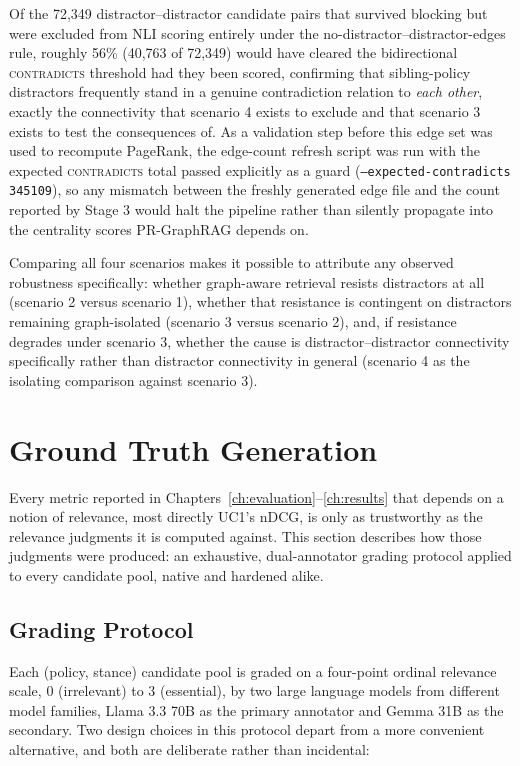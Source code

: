 Of the 72,349 distractor--distractor candidate pairs that survived blocking but were excluded from
NLI scoring entirely under the no-distractor--distractor-edges rule, roughly 56\% (40,763 of
72,349) would have cleared the bidirectional \textsc{contradicts} threshold had they been scored,
confirming that sibling-policy distractors frequently stand in a genuine contradiction relation to
\emph{each other}, exactly the connectivity that scenario 4 exists to exclude and that scenario 3
exists to test the consequences of. As a validation step before this edge set was used to
recompute PageRank, the edge-count refresh script was run with the expected \textsc{contradicts}
total passed explicitly as a guard (\texttt{--expected-contradicts 345109}), so any mismatch
between the freshly generated edge file and the count reported by Stage 3 would halt the pipeline
rather than silently propagate into the centrality scores PR-GraphRAG depends on.

Comparing all four scenarios makes it possible to attribute any observed robustness specifically:
whether graph-aware retrieval resists distractors at all (scenario 2 versus scenario 1), whether
that resistance is contingent on distractors remaining graph-isolated (scenario 3 versus scenario
2), and, if resistance degrades under scenario 3, whether the cause is distractor--distractor
connectivity specifically rather than distractor connectivity in general (scenario 4 as the
isolating comparison against scenario 3).

\section{Ground Truth Generation}
\label{sec:methodology-groundtruth}

Every metric reported in Chapters~\ref{ch:evaluation}--\ref{ch:results} that depends on a notion
of relevance, most directly UC1's nDCG, is only as trustworthy as the relevance judgments it is
computed against. This section describes how those judgments were produced: an exhaustive,
dual-annotator grading protocol applied to every candidate pool, native and hardened alike.

\subsection{Grading Protocol}
\label{sec:methodology-groundtruth-protocol}

Each (policy, stance) candidate pool is graded on a four-point ordinal relevance scale, 0
(irrelevant) to 3 (essential), by two large language models from different model families, Llama
3.3 70B \cite{grattafiori2024llama3} as the primary annotator and Gemma 31B
\cite{gemma2026gemma4} as the secondary. Two design choices in this protocol depart from a more
convenient alternative, and both are deliberate rather than incidental:

